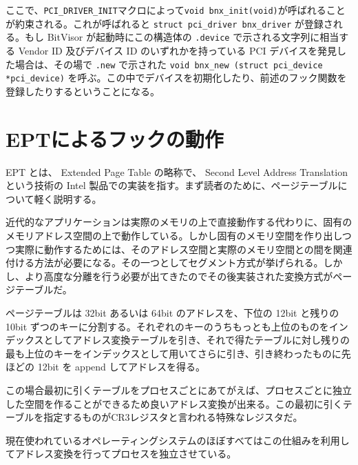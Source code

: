 \documentclass[a4paper,11pt,report]{ltjsbook}
\begin{document}
ここで、\lstinline!PCI_DRIVER_INIT!マクロによって\lstinline!void bnx_init(void)!が呼ばれることが約束される。これが呼ばれると \lstinline{struct pci_driver bnx_driver} が登録される。もし BitVisor が起動時にこの構造体の \lstinline{.device} で示される文字列に相当する Vendor ID 及びデバイス ID のいずれかを持っている PCI デバイスを発見した場合は、その場で \lstinline{.new} で示された \lstinline{void bnx_new (struct pci_device *pci_device)} を呼ぶ。この中でデバイスを初期化したり、前述のフック関数を登録したりするということになる。


\section{EPTによるフックの動作}
\label{aboutEPT}
EPT とは、 Extended Page Table の略称で、 Second Level Address Translation という技術の Intel 製品での実装を指す。まず読者のために、ページテーブルについて軽く説明する。

近代的なアプリケーションは実際のメモリの上で直接動作する代わりに、固有のメモリアドレス空間の上で動作している。しかし固有のメモリ空間を作り出しつつ実際に動作するためには、そのアドレス空間と実際のメモリ空間との間を関連付ける方法が必要になる。その一つとしてセグメント方式が挙げられる。しかし、より高度な分離を行う必要が出てきたのでその後実装された変換方式がページテーブルだ。

ページテーブルは 32bit あるいは 64bit のアドレスを、下位の 12bit と残りの 10bit ずつのキーに分割する。それぞれのキーのうちもっとも上位のものをインデックスとしてアドレス変換テーブルを引き、それで得たテーブルに対し残りの最も上位のキーをインデックスとして用いてさらに引き、引き終わったものに先ほどの 12bit を append してアドレスを得る。

この場合最初に引くテーブルをプロセスごとにあてがえば、プロセスごとに独立した空間を作ることができるため良いアドレス変換が出来る。この最初に引くテーブルを指定するものがCR3レジスタと言われる特殊なレジスタだ。

現在使われているオペレーティングシステムのほぼすべてはこの仕組みを利用してアドレス変換を行ってプロセスを独立させている。
\end{document}
